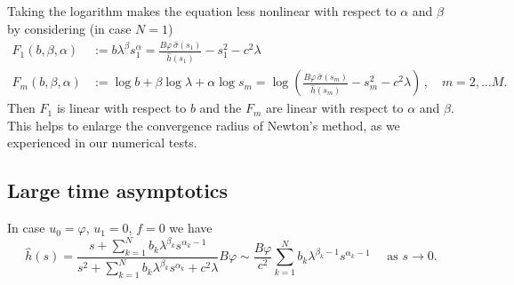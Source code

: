 Taking the logarithm makes the equation less nonlinear with respect to $\alpha$ and $\beta$ by considering (in case $N=1$)
\[
\begin{aligned}
F_1(b,\beta,\alpha)&:=
b \lambda^\beta s_1^\alpha
=\frac{B\varphi\, \hat{\sigma}(s_1)}{\hat{h}(s_1)}-
s_1^2-c^2\lambda\\
F_m(b,\beta,\alpha)&:=
\log b + \beta\log\lambda +\alpha \log s_m
=\log\left(\frac{B\varphi\, \hat{\sigma}(s_m)}{\hat{h}(s_m)}-
s_m^2-c^2\lambda\right)\,,\quad m=2,\ldots M.
\end{aligned}
\]
Then $F_1$ is linear with respect to $b$ and the $F_m$ are linear with respect to $\alpha$ and $\beta$. This helps to enlarge the convergence radius of Newton's method, as we experienced in our numerical tests.




\subsection{Large time asymptotics}

In case $u_0=\varphi$, $u_1=0$, $f=0$ we have 
\begin{equation}\label{eqn:hath}
\hat{h}(s) = \frac{s + \sum_{k=1}^N b_k\lambda^{\beta_k} s^{\alpha_k-1}}{s^2 + \sum_{k=1}^N b_k\lambda^{\beta_k} s^{\alpha_k} + c^2\lambda} B\varphi
\sim \frac{B\varphi}{c^2} \sum_{k=1}^N b_k\lambda^{\beta_k-1} s^{\alpha_k-1} \quad \mbox{ as }s\to0.
\end{equation}

